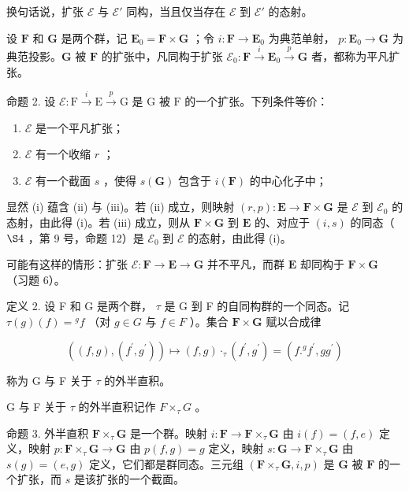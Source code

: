 换句话说，扩张 \(\mathcal{E}\) 与 \(\mathcal{E}'\) 同构，当且仅当存在 \(\mathcal{E}\) 到 \(\mathcal{E}'\) 的态射。

设 \(\mathbf{F}\) 和 \(\mathbf{G}\) 是两个群，记 \(\mathbf{E}_0 = \mathbf{F} \times \mathbf{G}\) ；令 \(i: \mathbf{F} \to \mathbf{E}_0\) 为典范单射， \(p: \mathbf{E}_0 \to \mathbf{G}\) 为典范投影。\(\mathbf{G}\) 被 \(\mathbf{F}\) 的扩张中，凡同构于扩张 \(\mathcal{E}_0: \mathbf{F} \xrightarrow{i} \mathbf{E}_0 \xrightarrow{p} \mathbf{G}\) 者，都称为平凡扩张。

命题 2. 设 \(\mathcal{E}:\mathrm{F}\xrightarrow{i}\mathrm{E}\xrightarrow{p}\mathrm{G}\) 是 \(\mathrm{G}\) 被 \(\mathrm{F}\) 的一个扩张。下列条件等价：

\begin{enumerate}
\def\labelenumi{(\roman{enumi})}
\item
  \(\mathcal{E}\) 是一个平凡扩张；
\item
  \(\mathcal{E}\) 有一个收缩 \(r\) ；
\item
  \(\mathcal{E}\) 有一个截面 \(s\) ，使得 \(s(\mathbf{G})\) 包含于 \(i(\mathbf{F})\) 的中心化子中；
\end{enumerate}

显然 (i) 蕴含 (ii) 与 (iii)。若 (ii) 成立，则映射 \((r, p): \mathbf{E} \to \mathbf{F} \times \mathbf{G}\) 是 \(\mathcal{E}\) 到 \(\mathcal{E}_0\) 的态射，由此得 (i)。若 (iii) 成立，则从 \(\mathbf{F} \times \mathbf{G}\) 到 \(\mathbf{E}\) 的、对应于 \((i, s)\) 的同态（ \(\S 4\) ，第 9 号，命题 12）是 \(\mathcal{E}_0\) 到 \(\mathcal{E}\) 的态射，由此得 (i)。

可能有这样的情形：扩张 \(\mathcal{E}:\mathbf{F}\to\mathbf{E}\to\mathbf{G}\) 并不平凡，而群 \(\mathbf{E}\) 却同构于 \(\mathbf{F}\times\mathbf{G}\) （习题 6）。

定义 2. 设 F 和 G 是两个群， \(\tau\) 是 G 到 F 的自同构群的一个同态。记 \(\tau(g)(f) = {}^g f\) （对 \(g \in G\) 与 \(f \in F\) ）。集合 \(\mathbf{F} \times \mathbf{G}\) 赋以合成律

\[
((f, g), (f ^ {\prime}, g ^ {\prime})) \mapsto (f, g) \cdot_ {\tau} (f ^ {\prime}, g ^ {\prime}) = (f. ^ {g} f ^ {\prime}, g g ^ {\prime})\tag{1}
\]

称为 G 与 F 关于 \(\tau\) 的外半直积。

G 与 F 关于 \(\tau\) 的外半直积记作 \(F \times_{\tau} G\) 。

命题 3. 外半直积 \(\mathbf{F} \times_{\tau} \mathbf{G}\) 是一个群。映射 \(i: \mathbf{F} \to \mathbf{F} \times_{\tau} \mathbf{G}\) 由 \(i(f) = (f, e)\) 定义，映射 \(p: \mathbf{F} \times_{\tau} \mathbf{G} \to \mathbf{G}\) 由 \(p(f, g) = g\) 定义，映射 \(s: \mathbf{G} \to \mathbf{F} \times_{\tau} \mathbf{G}\) 由 \(s(g) = (e, g)\) 定义，它们都是群同态。三元组 \((\mathbf{F} \times_{\tau} \mathbf{G}, i, p)\) 是 \(\mathbf{G}\) 被 \(\mathbf{F}\) 的一个扩张，而 \(s\) 是该扩张的一个截面。

